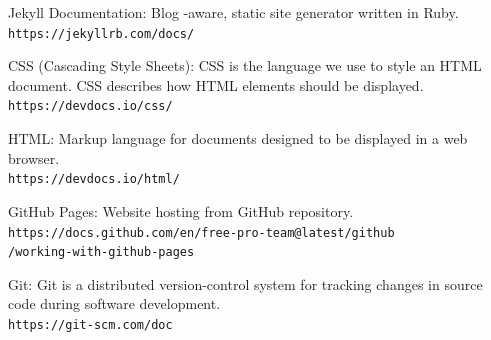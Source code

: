 \documentclass[a4paper,14pt]{extarticle}
\begin{document}
\begin{thebibliography}{5}
Jekyll Documentation: Blog -aware, static site generator written in Ruby.
\\\texttt{https://jekyllrb.com/docs/}

CSS (Cascading Style Sheets): CSS is the language we use to style an HTML document. CSS describes how HTML elements should be displayed.
\\\texttt{https://devdocs.io/css/}

HTML: Markup language for documents designed to be displayed in a web browser.
\\\texttt{https://devdocs.io/html/}

GitHub Pages: Website hosting from GitHub repository.
\\\texttt{https://docs.github.com/en/free-pro-team@latest/github\\/working-with-github-pages}

Git: Git is a distributed version-control system for tracking changes in source code during software development.
\\\texttt{https://git-scm.com/doc}

\end{thebibliography}
\end{document}
